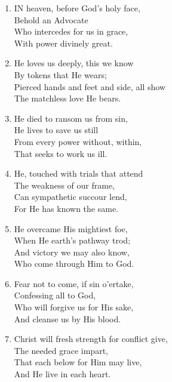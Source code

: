 \begin{enumerate}
    \item IN heaven, before God's holy face, \\
            Behold an Advocate \\
        Who intercedes for us in grace, \\
            With power divinely great.

    \item He loves us deeply, this we know \\
            By tokens that He wears; \\
        Pierced hands and feet and side, all show \\
            The matchless love He bears.

    \item He died to ransom us from sin, \\
            He lives to save us still \\
        From every power without, within, \\
            That seeks to work us ill.

    \item He, touched with trials that attend \\
            The weakness of our frame, \\
        Can sympathetic succour lend, \\
            For He has known the same.

    \item He overcame His mightiest foe, \\
            When He earth's pathway trod; \\
        And victory we may also know, \\
            Who come through Him to God.

    \item Fear not to come, if sin o'ertake, \\
            Confessing all to God, \\
        Who will forgive us for His sake, \\
            And cleanse us by His blood.

    \item Christ will fresh strength for conflict give, \\
            The needed grace impart, \\
        That each below for Him may live, \\
            And He live in each heart.

\end{enumerate}

